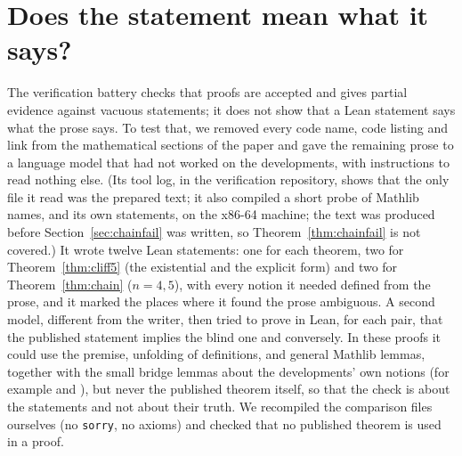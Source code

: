 \documentclass[11pt]{article}
\theoremstyle{definition}
\theoremstyle{remark}
\newcommand{\lean}[1]{\texttt{#1}}
\begin{document}
\section{Does the statement mean what it says?}\label{sec:blind}
The verification battery checks that proofs are accepted and gives partial evidence against vacuous
statements; it does not
show that a Lean statement says what the prose says. To test that, we removed every code name, code
listing and link from the mathematical sections of the paper and gave the remaining prose to a
language model that had not worked on the developments, with instructions to read nothing else. (Its
tool log, in the verification repository, shows that the only file it read was the prepared text; it also compiled a short
probe of Mathlib names, and its own statements, on the x86-64 machine; the text was produced before
Section~\ref{sec:chainfail} was written, so Theorem~\ref{thm:chainfail} is not covered.) It wrote twelve
Lean statements: one for each theorem, two for Theorem~\ref{thm:cliff5} (the existential and the explicit
form) and two for Theorem~\ref{thm:chain} ($n=4,5$), with every notion it needed defined from the prose,
and it marked the places where it found the prose ambiguous. A second model, different from the
writer, then tried to prove in Lean, for each pair, that the published statement implies the blind
one and conversely. In these proofs it could use the premise, unfolding of definitions, and general
Mathlib lemmas, together with the small bridge lemmas about the developments' own notions (for example
 and ), but never the published theorem
itself, so that the check is about the statements and not about their truth. We recompiled the
comparison files ourselves (no \lean{sorry}, no axioms) and checked that no published theorem is used
in a proof.
\end{document}
